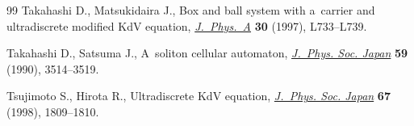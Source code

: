 \documentclass[pdftex]{sigma}
\numberwithin{equation}{section}
\begin{document}
\begin{thebibliography}{99}
Takahashi D., Matsukidaira J., Box and ball system with a~carrier and
 ultradiscrete modified {K}d{V} equation,
 \href{https://doi.org/10.1088/0305-4470/30/21/005}{\textit{J.~Phys.~A}}
 \textbf{30} (1997), L733--L739.

Takahashi D., Satsuma J., A~soliton cellular automaton,
 \href{https://doi.org/10.1143/JPSJ.59.3514}{\textit{J.~Phys. Soc. Japan}}
 \textbf{59} (1990), 3514--3519.

Tsujimoto S., Hirota R., Ultradiscrete {K}d{V} equation,
 \href{https://doi.org/10.1143/JPSJ.67.1809}{\textit{J.~Phys. Soc. Japan}}
 \textbf{67} (1998), 1809--1810.

\end{thebibliography}\LastPageEnding
\end{document}
